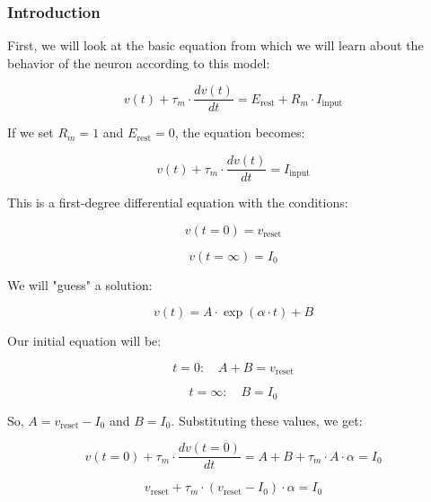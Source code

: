 \subsubsection{Introduction}

First, we will look at the basic equation from which we will learn about the behavior of the neuron according to this model:

\begin{equation}
v(t) + \tau_m \cdot \frac{dv(t)}{dt} = E_{\text{rest}} + R_m \cdot I_{\text{input}}
\end{equation}

If we set \( R_m = 1 \) and \( E_{\text{rest}} = 0 \), the equation becomes:

\begin{equation}
v(t) + \tau_m \cdot \frac{dv(t)}{dt} = I_{\text{input}}
\end{equation}

This is a first-degree differential equation with the conditions:

\begin{equation}
v(t=0) = v_{\text{reset}}
\end{equation}

\begin{equation}
v(t=\infty) = I_0
\end{equation}

We will "guess" a solution: 

\begin{equation}
v(t) = A \cdot \exp(\alpha \cdot t) + B
\end{equation}

Our initial equation will be:

\begin{equation}
t=0 : \quad A + B = v_{\text{reset}}
\end{equation}

\begin{equation}
t=\infty : \quad B = I_0
\end{equation}

So, \( A = v_{\text{reset}} - I_0 \) and \( B = I_0 \). Substituting these values, we get:

\begin{equation}
v(t=0) + \tau_m \cdot \frac{dv(t=0)}{dt} = A + B + \tau_m \cdot A \cdot \alpha = I_0
\end{equation}

\begin{equation}
v_{\text{reset}} + \tau_m \cdot (v_{\text{reset}} - I_0) \cdot \alpha = I_0
\end{equation}

